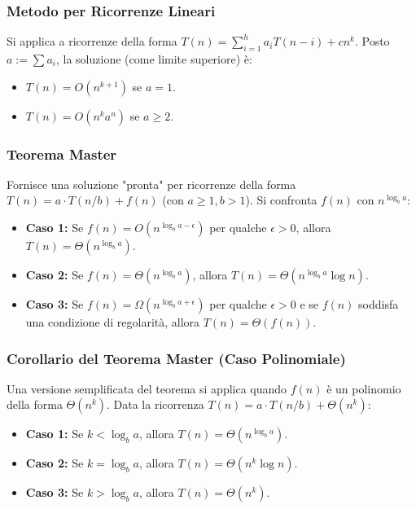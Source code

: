 \subsubsection{Metodo per Ricorrenze Lineari}
Si applica a ricorrenze della forma $T(n) = \sum_{i=1}^{h} a_i T(n-i) + cn^k$. Posto $a := \sum a_i$, la soluzione (come limite superiore) è:
\begin{itemize}
    \item $T(n) = O(n^{k+1})$ se $a=1$.
    \item $T(n) = O(n^k a^n)$ se $a \ge 2$.
\end{itemize}

\subsubsection{Teorema Master}
Fornisce una soluzione "pronta" per ricorrenze della forma $T(n) = a \cdot T(n/b) + f(n)$ (con $a \ge 1, b > 1$). Si confronta $f(n)$ con $n^{\log_b a}$:
\begin{itemize}
    \item \textbf{Caso 1:} Se $f(n) = O(n^{\log_b a - \epsilon})$ per qualche $\epsilon > 0$, allora $T(n) = \Theta(n^{\log_b a})$.
    \item \textbf{Caso 2:} Se $f(n) = \Theta(n^{\log_b a})$, allora $T(n) = \Theta(n^{\log_b a} \log n)$.
    \item \textbf{Caso 3:} Se $f(n) = \Omega(n^{\log_b a + \epsilon})$ per qualche $\epsilon > 0$ e se $f(n)$ soddisfa una condizione di regolarità, allora $T(n) = \Theta(f(n))$.
\end{itemize}

\subsubsection*{Corollario del Teorema Master (Caso Polinomiale)}
Una versione semplificata del teorema si applica quando $f(n)$ è un polinomio della forma $\Theta(n^k)$. Data la ricorrenza $T(n) = a \cdot T(n/b) + \Theta(n^k)$:
\begin{itemize}
    \item \textbf{Caso 1:} Se $k < \log_b a$, allora $T(n) = \Theta(n^{\log_b a})$.
    \item \textbf{Caso 2:} Se $k = \log_b a$, allora $T(n) = \Theta(n^k \log n)$.
    \item \textbf{Caso 3:} Se $k > \log_b a$, allora $T(n) = \Theta(n^k)$.
\end{itemize}